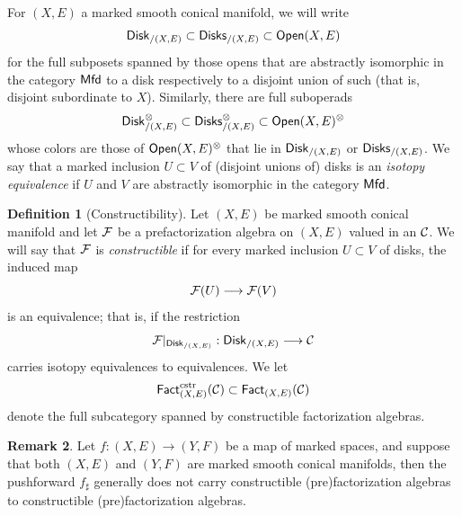 \documentclass[10pt, reqno, twoside
, final
]{amsart}
\numberwithin{equation}{subsection}%
\theoremstyle{definition}
\newtheorem{defn}{Definition}[subsection]
\theoremstyle{definition}
\theoremstyle{definition}
\theoremstyle{definition}
\theoremstyle{definition}
\theoremstyle{definition}
\theoremstyle{definition}
\theoremstyle{definition}
\theoremstyle{definition}
\theoremstyle{plain}
\theoremstyle{definition}
\theoremstyle{plain}
\theoremstyle{definition}
\theoremstyle{plain}
\theoremstyle{definition}
\newtheorem{rmk}[defn]{Remark}
\theoremstyle{definition}
\theoremstyle{plain}
\theoremstyle{plain}
\theoremstyle{definition}
\theoremstyle{plain}
\theoremstyle{plain}
\theoremstyle{plain}
\begin{document}
For $(X,E)$ a marked smooth conical manifold, we will write 
\[  \mathsf{Disk}_{/(X,E)}\subset \mathsf{Disks}_{/(X,E)} \subset \mathsf{Open}(X,E)   \]
for the full subposets spanned by those opens that are abstractly isomorphic in the category $\mathsf{Mfd}$ to a disk respectively to a disjoint union of such (that is, disjoint subordinate to $X$). Similarly, there are full suboperads 
\[  \mathsf{Disk}_{/(X,E)}^{\otimes}\subset \mathsf{Disks}_{/(X,E)}^{\otimes} \subset \mathsf{Open}(X,E)^{\otimes}   \]
whose colors are those of $\mathsf{Open}(X,E)^{\otimes}$ that lie in $\mathsf{Disk}_{/(X,E)}$ or $\mathsf{Disks}_{/(X,E)}$. We say that a marked inclusion $U\subset V$ of (disjoint unions of) disks is an \emph{isotopy equivalence} if $U$ and $V$ are abstractly isomorphic in the category $\mathsf{Mfd}$.
\begin{defn}[Constructibility]
Let $(X,E)$ be marked smooth conical manifold and let $\mathcal{F}$ be a prefactorization algebra on $(X,E)$ valued in an \infcat $\mathcal{C}$. We will say that $\mathcal{F}$ is \emph{constructible} if for every marked inclusion $U\subset V$ of disks, the induced map
\[  \mathcal{F}(U) \longrightarrow \mathcal{F}(V)\]
is an equivalence; that is, if the restriction 
\[ \mathcal{F}|_{\mathsf{Disk}_{/(X,E)}}:\mathsf{Disk}_{/(X,E)}\longrightarrow \mathcal{C}\]
carries isotopy equivalences to equivalences. We let
\[ \mathsf{Fact}^{\mathrm{cstr}}_{(X,E)}(\mathcal{C})\subset \mathsf{Fact}_{(X,E)}(\mathcal{C}) \]
denote the full subcategory spanned by constructible factorization algebras.
\end{defn}

\begin{rmk}
Let $f:(X,E)\rightarrow (Y,F)$ be a map of marked spaces, and suppose that both $(X,E)$ and $(Y,F)$ are marked smooth conical manifolds, then the pushforward $f_{\sharp}$ generally does not carry constructible (pre)factorization algebras to constructible (pre)factorization algebras.
\end{rmk}
\end{document}
